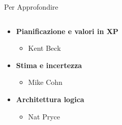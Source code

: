 	\begin{frame}{Per Approfondire}
		\begin{columns}[T]
		    \begin{column}{.8\textwidth}
			
				\begin{itemize}	
					\item \textbf{Pianificazione e valori in XP}
						\begin{itemize}
							\item {\small Kent Beck }
						\end{itemize}

					\item \textbf{Stima e incertezza}
						\begin{itemize}
							\item {\small Mike Cohn }
						\end{itemize}

					\item \textbf{Architettura logica}
						\begin{itemize}
							\item {\small Nat Pryce }
						\end{itemize}


\end{itemize}
\end{column}
\end{columns}
\end{frame}
